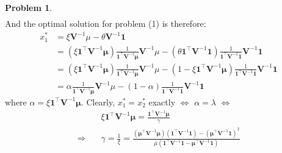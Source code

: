 \documentclass[a4paper, 8pt]{article}
\theoremstyle{definition}
\newtheorem{problem}{Problem}
\theoremstyle{hSol}
\begin{document}
\begin{problem}
\begin{equation}
\begin{split}
	\end{split}
\end{equation}
And the optimal solution for problem (1) is therefore:
\begin{equation}
	\begin{split}
		x^*_1 &= \xi \bm{V}^{-1}\mu - \theta \bm{V}^{-1}\bm{1} \\
		&=(\xi\bm{1}^{\top}\bm{V}^{-1}\bm{\mu}) \frac{1}{\bm{1}^{\top}\bm{V}^{-1}\bm{\mu}}\bm{V}^{-1}\mu - (\theta\bm{1}^{\top}\bm{V}^{-1}\bm{1}) \frac{1}{\bm{1}^{\top}\bm{V}^{-1}\bm{1}} \bm{V}^{-1}\bm{1} \\
		& = (\xi\bm{1}^{\top}\bm{V}^{-1}\bm{\mu}) \frac{1}{\bm{1}^{\top}\bm{V}^{-1}\bm{\mu}}\bm{V}^{-1}\mu - (1-\xi\bm{1}^{\top}\bm{V}^{-1}\bm{\mu}) \frac{1}{\bm{1}^{\top}\bm{V}^{-1}\bm{1}} \bm{V}^{-1}\bm{1} \\
		& = \alpha \frac{1}{\bm{1}^{\top}\bm{V}^{-1}\bm{\mu}}\bm{V}^{-1}\mu - (1- \alpha) \frac{1}{\bm{1}^{\top}\bm{V}^{-1}\bm{1}} \bm{V}^{-1}\bm{1}
	\end{split}
\end{equation}
where $\alpha = \xi\bm{1}^{\top}\bm{V}^{-1}\bm{\mu}$. Clearly, $x^*_1 = x^*_2$ exactly $\iff$ $\alpha = \lambda$ $\iff$
\begin{equation}
	\begin{split}
		&\xi\bm{1}^{\top}\bm{V}^{-1}\bm{\mu} = \frac{ \bm{1}^{\top}\bm{V}^{-1}\bm{\mu}}{\gamma} \\
		\Rightarrow \quad & \gamma = \frac{1}{\xi} = \frac{(\bm{\mu}^{\top}\bm{V}^{-1}\bm{\mu})(\bm{1}^{\top}\bm{V}^{-1}\bm{1}) - (\bm{\mu}^{\top}\bm{V}^{-1}\bm{1})^2}{\bar{\mu}(\bm{1}^{\top}\bm{V}^{-1}\bm{1} - \bm{\mu}^{\top}\bm{V}^{-1}\bm{1})}
	\end{split}
\end{equation}
\end{problem}
\end{document}

